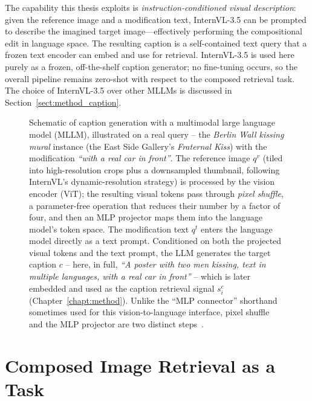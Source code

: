 The capability this thesis exploits is \emph{instruction-conditioned visual
description}: given the reference image and a modification text, InternVL-3.5
can be prompted to describe the imagined target image---effectively performing
the compositional edit in language space. The resulting caption is a
self-contained text query that a frozen text encoder can embed and use for
retrieval. InternVL-3.5 is used here purely as a frozen, off-the-shelf caption
generator; no fine-tuning occurs, so the overall pipeline remains zero-shot with
respect to the composed retrieval task. The choice of InternVL-3.5 over other
MLLMs is discussed in Section~\ref{sect:method_caption}.

\begin{figure}[H]
  \centering
  \resizebox{\textwidth}{!}{}
  \caption[Schematic of MLLM-based caption generation.]{Schematic of caption
    generation with a multimodal large language model (MLLM), illustrated on
    a real query -- the \emph{Berlin Wall kissing mural} instance (the East
    Side Gallery's \emph{Fraternal Kiss}) with the modification
    \emph{``with a real car in front''}. The reference image $q^v$ (tiled into
    high-resolution crops plus a downsampled thumbnail, following InternVL's
    dynamic-resolution strategy) is processed by the vision encoder (ViT);
    the resulting visual tokens pass through \emph{pixel shuffle}, a
    parameter-free operation that reduces their number by a factor of four,
    and then an MLP projector maps them into the language model's token
    space. The modification text $q^t$ enters the language model directly as
    a text prompt. Conditioned on both the projected visual tokens and the
    text prompt, the LLM generates the target caption $c$ -- here, in full,
    \emph{``A poster with two men kissing, text in multiple languages, with a
    real car in front''} -- which is later embedded and used as the caption
    retrieval signal $s^c_i$ (Chapter~\ref{chapt:method}). Unlike the
    ``MLP connector'' shorthand sometimes used for this vision-to-language
    interface, pixel shuffle and the MLP projector are two distinct
    steps~\cite{wang2025internvl35}.}\label{fig:bg_mllm}
\end{figure}

\section{Composed Image Retrieval as a Task}\label{sect:bg_cir}

